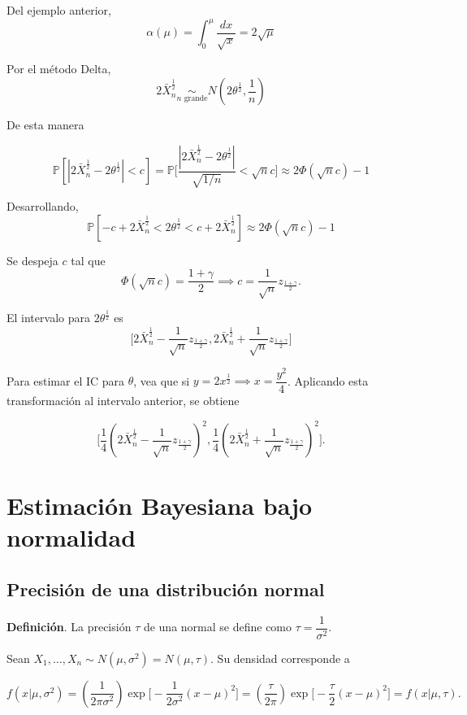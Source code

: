 \documentclass[
  12pt,
]{book}
\begin{document}
Del ejemplo anterior,
\[\alpha(\mu) = \int_{0}^\mu\dfrac{dx}{\sqrt x} = 2\sqrt \mu\]

Por el método Delta,
\[2\bar X_n^{\frac12} \underset{n \text{ grande}}{\sim} N\left(2\theta^{\frac 12},\dfrac1n\right)\]

De esta manera

\[\mathbb P[|2\bar X_n^{\frac12}-2\theta^{\frac12}|<c] =\mathbb P\Bigg[\dfrac{|2\bar X_n^{\frac12}-2\theta^{\frac12}|}{\sqrt{1/n}}<\sqrt nc\Bigg] \approx 2\Phi(\sqrt nc)-1  \]

Desarrollando,
\[\mathbb P[-c+2\bar X_n^{\frac12}<2\theta^{\frac 12}<c+2\bar X_n^{\frac12}]\approx 2\Phi(\sqrt nc)-1  \]

Se despeja \(c\) tal que
\[\Phi(\sqrt n  c) = \dfrac{1+\gamma}2\implies c = \dfrac 1{\sqrt n} z_{\frac{1+\gamma}2}.\]

El intervalo para \(2\theta^{\frac 12}\) es
\[\bigg[2\bar X_n^{\frac 12} -\dfrac 1{\sqrt n} z_{\frac{1+\gamma}2},2\bar X_n^{\frac 12} +\dfrac 1{\sqrt n} z_{\frac{1+\gamma}2}\bigg]\]

Para estimar el IC para \(\theta\), vea que si \(y=2x^{\frac12} \implies x = \dfrac{y^2}{4}\). Aplicando esta transformación al intervalo anterior, se obtiene

\[\bigg[\dfrac 14 \left(2\bar X_n^{\frac 12} -\dfrac 1{\sqrt n} z_{\frac{1+\gamma}2}\right)^2,\dfrac 14 \left(2\bar X_n^{\frac 12} +\dfrac 1{\sqrt n} z_{\frac{1+\gamma}2}\right)^2\bigg].\]

\hypertarget{estimaciuxf3n-bayesiana-bajo-normalidad}{%
\chapter{Estimación Bayesiana bajo normalidad}\label{estimaciuxf3n-bayesiana-bajo-normalidad}}

\hypertarget{precisiuxf3n-de-una-distribuciuxf3n-normal}{%
\section{Precisión de una distribución normal}\label{precisiuxf3n-de-una-distribuciuxf3n-normal}}

\textbf{Definición}. La precisión \(\tau\) de una normal se define como \(\tau = \dfrac 1{\sigma^2}\).

Sean \(X_1,\dots,X_n\sim N(\mu,\sigma^2) = N(\mu,\tau)\). Su densidad corresponde a

\[f(x|\mu,\sigma^2) = \left(\dfrac 1{2\pi\sigma^2}\right)\exp\bigg[-\dfrac1{2\sigma^2}(x-\mu)^2\bigg] = \left(\dfrac \tau{2\pi}\right)\exp\bigg[-\dfrac\tau{2}(x-\mu)^2\bigg]=f(x|\mu,\tau).\]
\end{document}
